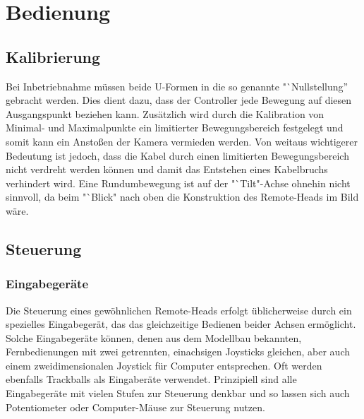\documentclass[a4paper, 12pt, bibliography=totocnumbered, listof=numbered]{scrartcl}
\begin{document}
	\section{Bedienung}
	\subsection{Kalibrierung}
	Bei Inbetriebnahme müssen beide U-Formen in die so genannte "`Nullstellung” gebracht werden. Dies dient dazu, dass der Controller jede Bewegung auf diesen Ausgangspunkt beziehen kann. Zusätzlich wird durch die Kalibration von Minimal- und Maximalpunkte ein limitierter Bewegungsbereich festgelegt  und somit kann ein Anstoßen der Kamera vermieden werden. Von weitaus wichtigerer Bedeutung ist jedoch, dass die Kabel durch einen limitierten Bewegungsbereich nicht verdreht werden können und damit das Entstehen eines Kabelbruchs verhindert wird. Eine Rundumbewegung ist auf der "`Tilt"-Achse ohnehin nicht sinnvoll, da beim "`Blick" nach oben die Konstruktion des Remote-Heads im Bild wäre.

	\subsection{Steuerung}
	\subsubsection{Eingabegeräte}
	Die Steuerung eines gewöhnlichen Remote-Heads erfolgt üblicherweise durch ein spezielles Eingabegerät, das das gleichzeitige Bedienen beider Achsen ermöglicht. Solche Eingabegeräte können, denen aus dem Modellbau bekannten, Fernbedienungen mit zwei getrennten, einachsigen Joysticks gleichen, aber auch einem zweidimensionalen Joystick für Computer entsprechen. Oft werden ebenfalls Trackballs als Eingaberäte verwendet. Prinzipiell sind alle Eingabegeräte mit vielen Stufen zur Steuerung denkbar und so lassen sich auch Potentiometer oder Computer-Mäuse zur Steuerung nutzen.
\end{document}
